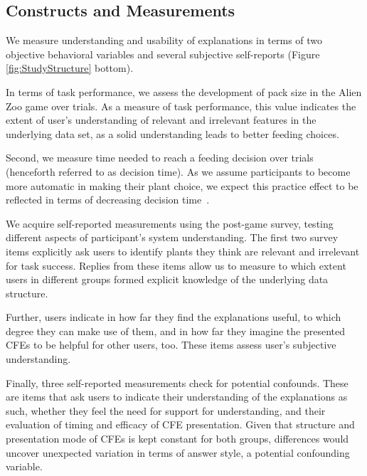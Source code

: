 \subsection{Constructs and Measurements}

We measure understanding and usability of explanations in terms of two objective behavioral variables and several subjective self-reports (Figure \ref{fig:StudyStructure} bottom). 

In terms of task performance, we assess the development of pack size in the Alien Zoo game over trials. 
As a measure of task performance, this value indicates the extent of user's understanding of relevant and irrelevant features in the underlying data set, as a solid understanding leads to better feeding choices. 

Second, we measure time needed to reach a feeding decision over trials (henceforth referred to as decision time). As we assume participants to become more automatic in making their plant choice, we expect this practice effect to be reflected in terms of decreasing decision time~\citep{logan_shapes_1992}. 

We acquire self-reported measurements using the post-game survey, testing different aspects of participant's system understanding. 
The first two survey items explicitly ask users to identify plants they think are relevant and irrelevant for task success. 
Replies from these items allow us to measure to which extent users in different groups formed explicit knowledge of the underlying data structure.

Further, users indicate in how far they find the explanations useful, to which degree they can make use of them, and in how far they imagine the presented \glspl{CFE} to be helpful for other users, too. These items assess user's subjective understanding.

Finally, three self-reported measurements check for potential confounds. 
These are items that ask users to indicate their understanding of the explanations as such, whether they feel the need for support for understanding, and their evaluation of timing and efficacy of \gls{CFE} presentation.
Given that structure and presentation mode of \glspl{CFE} is kept constant for both groups, differences would uncover unexpected variation in terms of answer style, a potential confounding variable.

